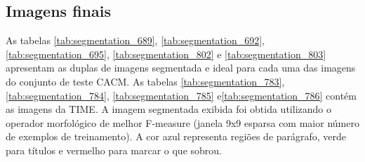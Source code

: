 \documentclass[a4paper,11pt]{article}
\begin{document}
\clearpage

  \subsection{Imagens finais}

    As tabelas \ref{tab:segmentation_689}, \ref{tab:segmentation_692}, \ref{tab:segmentation_695}, \ref{tab:segmentation_802} e \ref{tab:segmentation_803} apresentam as duplas de imagens segmentada e ideal para cada uma das imagens do conjunto de teste CACM. As tabelas \ref{tab:segmentation_783}, \ref{tab:segmentation_784}, \ref{tab:segmentation_785} e\ref{tab:segmentation_786} contém as imagens da TIME. A imagem segmentada exibida foi obtida utilizando o operador morfológico de melhor F-measure (janela 9x9 esparsa com maior número de exemplos de treinamento). A cor azul representa regiões de parágrafo, verde para títulos e vermelho para marcar o que sobrou.
\end{document}
